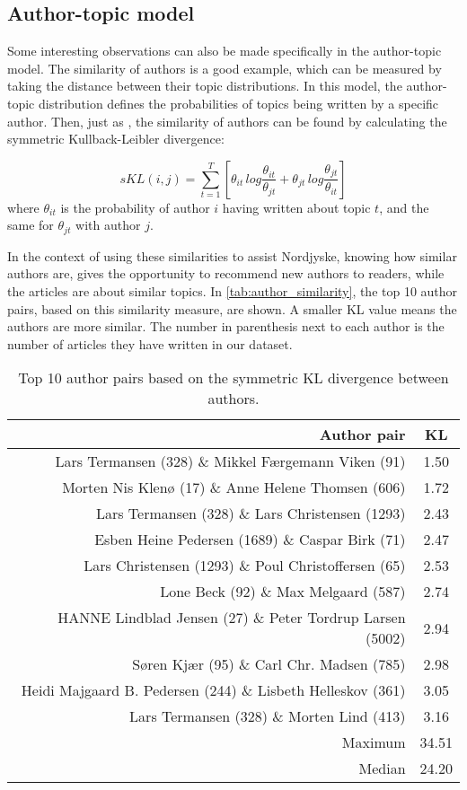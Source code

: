 \subsection{Author-topic model}\label{sec:discussion_author_topic}
Some interesting observations can also be made specifically in the author-topic model.
The similarity of authors is a good example, which can be measured by taking the distance between their topic distributions.
In this model, the author-topic distribution defines the probabilities of topics being written by a specific author.
Then, just as \citet{author_topic_2012}, the similarity of authors can be found by calculating the symmetric Kullback-Leibler divergence:

\begin{equation} \label{eq:author_similarity}
	sKL(i,j) = \sum_{t=1}^{T}\left[\theta_{it}\, log \frac{\theta_{it}}{\theta_{jt}} + \theta_{jt}\, log \frac{\theta_{jt}}{\theta_{it}}\right]
\end{equation}
\noindent where $\theta_{it}$ is the probability of author $i$ having written about topic $t$, and the same for $\theta_{jt}$ with author $j$.

In the context of using these similarities to assist Nordjyske, knowing how similar authors are, gives the opportunity to recommend new authors to readers, while the articles are about similar topics.
In \autoref{tab:author_similarity}, the top 10 author pairs, based on this similarity measure, are shown.
A smaller KL value means the authors are more similar.
The number in parenthesis next to each author is the number of articles they have written in our dataset.

\begin{table}[h]
	\centering
	\caption{Top 10 author pairs based on the symmetric KL divergence between authors.}
	\begin{tabular}{r|c}
		Author pair & KL \\
		\midrule
		Lars Termansen (328) \& Mikkel Færgemann Viken (91) & 1.50 \\
		Morten Nis Klenø (17) \& Anne Helene Thomsen (606) & 1.72 \\
		Lars Termansen (328) \& Lars Christensen (1293) & 2.43 \\
		Esben Heine Pedersen (1689) \& Caspar Birk (71) & 2.47 \\
		Lars Christensen (1293) \& Poul Christoffersen (65) & 2.53 \\
		Lone Beck (92) \& Max Melgaard (587) & 2.74 \\
		HANNE Lindblad Jensen (27) \& Peter Tordrup Larsen (5002) & 2.94 \\
		Søren Kjær (95) \& Carl Chr. Madsen (785) & 2.98 \\
		Heidi Majgaard B. Pedersen (244) \& Lisbeth Helleskov (361) & 3.05 \\
		Lars Termansen (328) \& Morten Lind (413) & 3.16 \\
		\midrule
		Maximum & 34.51 \\
		Median & 24.20 \\
	\end{tabular}
	\label{tab:author_similarity}
\end{table}

